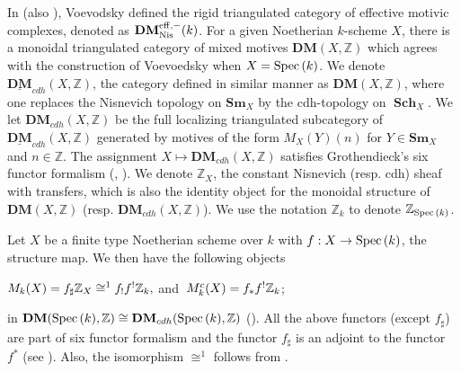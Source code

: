 \documentclass[12pt]{amsart}
\theoremstyle{remark}
\renewcommand{\1}{{\mathbb{S}}}
\newcommand{\Spec}{{\rm Spec \,}}
\newcommand{\Sch}{{\operatorname{\mathbf{Sch}}}}
\newcommand{\<}{\langle}
\renewcommand{\>}{\rangle}
\newcommand{\Sm}{{\mathbf{Sm}}}
\newcommand{\eff}{{\operatorname{\rm eff}}}
\newcommand{\Nis}{{\operatorname{Nis}}}
\begin{document}
In \cite{Voe} (also \cite{MVW}), Voevodsky defined the rigid triangulated category of effective motivic complexes, denoted as $\textbf{DM}^{\eff,-}_{\Nis} (k)$. For a given Noetherian $k$-scheme $X$, there is a monoidal triangulated category of mixed motives  
$\textbf{DM}(X, \mathbb{Z})$ \cite[Theorem 11.4.5]{CD1} which agrees with the construction of Voevoedsky \cite{Voe} when $X = \Spec(k)$. We denote $ \underline{\textbf{DM}}_{cdh}(X, \mathbb{Z})$, the category defined in similar manner as $\textbf{DM}(X,  \mathbb{Z})$, where  one replaces the Nisnevich topology on $\Sm_{X}$ by the cdh-topology on $\Sch_{X}$. We let $\textbf{DM}_{cdh}(X,\mathbb{Z})$ be the full localizing triangulated subcategory of $ \underline{\textbf{DM}}_{cdh}(X, \mathbb{Z})$ generated by motives of the form $M_{X}(Y)(n)$ for $Y \in \Sm_{X}$ and $n \in \mathbb{Z}$. The assignment $X \mapsto \textbf{DM}_{cdh}(X, \mathbb{Z})$ satisfies Grothendieck's six functor formalism (\cite[A.5]{CD1}, \cite{CD2}). We denote $\mathbb{Z}_{X}$, the constant Nisnevich (resp. cdh) sheaf with transfers, which is also the identity object for the monoidal structure of $\textbf{DM}(X, \mathbb{Z})$ (resp. $\textbf{DM}_{cdh}(X, \mathbb{Z})$). We use the notation $\mathbb{Z}_{k}$ to denote $\mathbb{Z}_{\Spec(k)}$. 


  Let $X$ be a finite type Noetherian scheme over $k$ with $f : X \rightarrow \Spec(k)$, the structure map. We then have the following objects
\begin{center}
	$M_{k}(X) = f_{\sharp}\mathbb{Z}_{X} \hspace{1mm} {\cong}^{1} \hspace{1mm} f_{!}f^{!}\mathbb{Z}_{k},  \hspace{1mm}  $and$  \hspace{2mm} M_{k}^{c}(X) = f_{\ast}f^{!}\mathbb{Z}_{k}$;
\end{center} 
in $\textbf{DM}(\Spec(k), \mathbb{Z}) \cong \textbf{DM}_{cdh}(\Spec(k), \mathbb{Z})$ (\cite[Corollary 5.9]{CD2}). All the above functors (except $f_{\sharp}$) are part of six functor formalism and the functor $f_{\sharp}$ is an adjoint to the functor $f^{\ast}$ (see \cite[(Remark 8.5)]{CD2}). Also, the isomorphism ${\cong}^{1}$ follows from \cite[(8.7.1)]{CD2}. 
\end{document}
